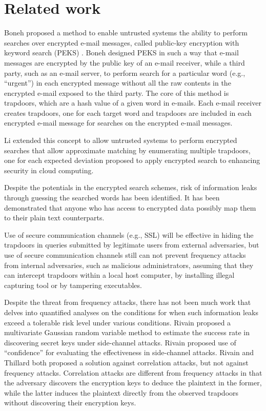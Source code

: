 \documentclass[ ../main.tex]{subfiles}
\begin{document}
\section{Related work}
\label{sec:relatedwork}
Boneh proposed a method to enable untrusted systems the ability to perform searches over encrypted e-mail messages, called public-key encryption with keyword search (PEKS) \cite{ref4}. Boneh designed PEKS in such a way that e-mail messages are encrypted by the public key of an e-mail receiver, while a third party, such as an e-mail server, to perform search for a particular word (e.g., ``urgent'') in each encrypted message without all the raw contents in the encrypted e-mail exposed to the third party. The core of this method is trapdoors, which are a hash value of a given word in e-mails. Each e-mail receiver creates trapdoors, one for each target word and trapdoors are included in each encrypted e-mail message for searches on the encrypted e-mail messages.

Li extended this concept to allow untrusted systems to perform encrypted searches that allow approximate matching by enumerating multiple trapdoors, one for each expected deviation\cite{ref5,ref6,ref7,ref8} proposed to apply encrypted search to enhancing security in cloud computing.

Despite the potentials in the encrypted search schemes, risk of information leaks through guessing the searched words has been identified\cite{ref11,ref12,ref13}. It has been demonstrated\cite{ref11,ref12,ref13} that anyone who has access to encrypted data possibly map them to their plain text counterparts.

Use of secure communication channels (e.g., SSL) will be effective in hiding the trapdoors in queries submitted by legitimate users from external adversaries, but use of secure communication channels still can not prevent frequency attacks from internal adversaries, such as malicious administrators, assuming that they can intercept trapdoors within a local host computer, by installing illegal capturing tool or by tampering executables.

Despite the threat from frequency attacks, there has not been much work that delves into quantified analyses on the conditions for when such information leaks exceed a tolerable risk level under various conditions. Rivain proposed a multivariate Gaussian random variable method to estimate the success rate in discovering secret keys under side-channel attacks\cite{ref14}. Rivain proposed use of ``confidence'' for evaluating the effectiveness in side-channel attacks\cite{ref15}. Rivain and Thillard both proposed a solution against correlation attacks, but not against frequency attacks. Correlation attacks are different from frequency attacks in that the adversary discovers the encryption keys to deduce the plaintext in the former, while the latter induces the plaintext directly from the observed trapdoors without discovering their encryption keys.
\end{document}
